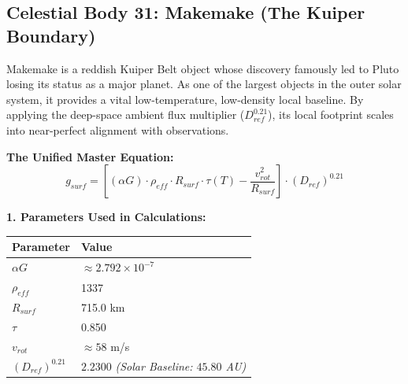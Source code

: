 \documentclass[11pt, a4paper]{article}
\begin{document}
\clearpage
\subsection{Celestial Body 31: Makemake (The Kuiper Boundary)}
  Makemake is a reddish Kuiper Belt object whose discovery famously led to Pluto losing its status as a major planet. As one of the largest objects in the outer solar system, it provides a vital low-temperature, low-density local baseline. By applying the deep-space ambient flux multiplier ($D_{ref}^{0.21}$), its local footprint scales into near-perfect alignment with observations.

  \vspace{0.5em}
  \noindent \textbf{The Unified Master Equation:}
  $$ g_{surf} = \left[ (\alpha G) \cdot \rho_{eff} \cdot R_{surf} \cdot \tau(T) - \frac{v_{rot}^2}{R_{surf}} \right] \cdot (D_{ref})^{0.21} $$

  \vspace{0.5em}
  \noindent \textbf{1. Parameters Used in Calculations:} \\[0.5em]
  \begingroup
  \renewcommand{\arraystretch}{1.3}
  \hspace*{2em}
  \begin{tabular}{|l|l|}
    \hline
    \textbf{Parameter} & \textbf{Value} \\ \hline
    $\alpha G$ & $\approx 2.792 \times 10^{-7}$ \\ \hline
    $\rho_{eff}$ & 1337 \\ \hline
    $R_{surf}$ & 715.0 km \\ \hline
    $\tau$ & 0.850 \\ \hline
    $v_{rot}$ & $\approx 58$ m/s \\ \hline
    $(D_{ref})^{0.21}$ & $2.2300$ \textit{(Solar Baseline: $45.80$ AU)} \\ \hline
  \end{tabular}
  \endgroup
\end{document}
